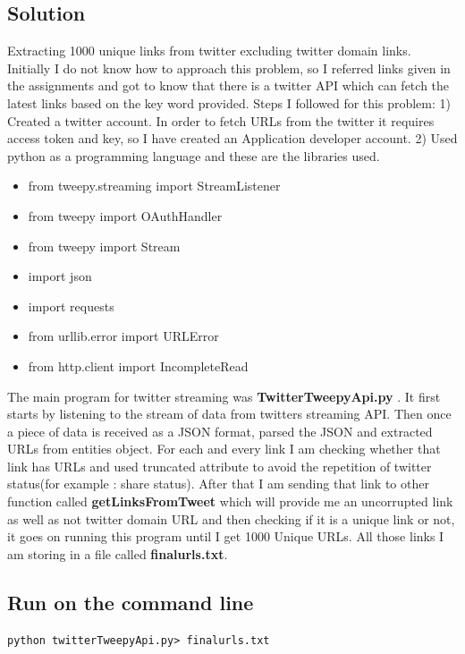 \documentclass[letterpaper,11pt]{article}
\begin{document}
\subsection*{Solution}
Extracting 1000 unique links from twitter excluding twitter domain links. Initially I do not know how to approach this problem, so I referred links given in the assignments and got to know that there is a twitter API which can fetch the latest links based on the key word provided.
Steps I followed for this problem:
	1)	Created a twitter account. In order to fetch URLs from the twitter it requires access token and key,  so I have created an Application developer account.
	2)	Used python as a programming language and these are the libraries used.

	\begin{itemize}
  \item from tweepy.streaming import StreamListener
  \item from tweepy import OAuthHandler
  \item from tweepy import Stream
  \item import json
  \item import requests
  \item from urllib.error import  URLError
  \item	from http.client import IncompleteRead

\end{itemize}
The main program for twitter streaming was \textbf{TwitterTweepyApi.py} . It first starts by listening to the stream of data from twitters streaming API. Then once a piece of data is received as a JSON format, parsed the JSON and extracted URLs from entities object.  For each and every link I am checking whether that link has URLs and used truncated attribute to avoid the repetition of twitter status(for example : share status). After that I am sending that link to other function called  \textbf{getLinksFromTweet}  which will provide me an uncorrupted link as well as not twitter domain URL and then checking if it is a unique link or not, it goes on running this program until I get 1000 Unique URLs. All those links I am storing in a file called \textbf{finalurls.txt}.
\subsection*{Run on the command line}
\begin{lstlisting}[frame=single]
python twitterTweepyApi.py> finalurls.txt
\end{lstlisting}
\end{document}
